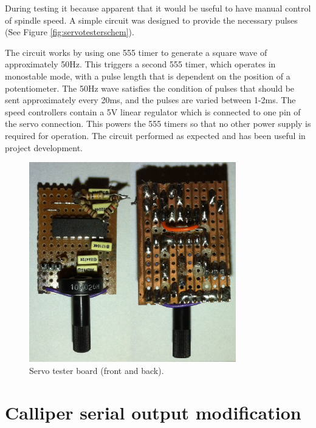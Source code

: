During testing it because apparent that it would be useful to have manual control of spindle speed. A simple circuit was designed to provide the necessary pulses (See Figure \ref{fig:servotesterschem}).

The circuit works by using one 555 timer to generate a square wave of approximately 50Hz. This triggers a second 555 timer, which operates in monostable mode, with a pulse length
that is dependent on the position of a potentiometer. The 50Hz wave satisfies the condition of pulses that should be sent approximately every 20ms, and the pulses are varied between 1-2ms. The speed controllers
contain a 5V linear regulator which is connected to one pin of the servo connection. This powers the 555 timers so that no other power supply is required for operation. The circuit performed as expected and 
has been useful in project development.

\begin{figure}[ht!]
\centering
\includegraphics[width=90mm]{resources/servotester.jpg}
\caption{Servo tester board (front and back).}
\label{overflow}
\end{figure}

\newpage
\section{Calliper serial output modification}

